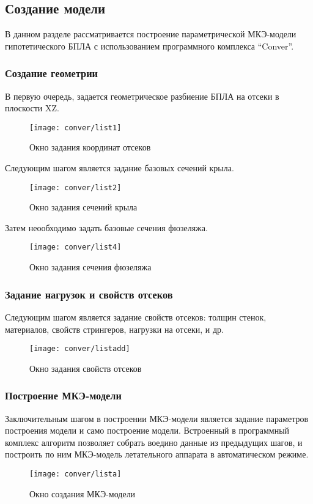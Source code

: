 \subsection{Создание модели}
\label{sec:creationOfOneModel}

В данном разделе рассматривается построение параметрической МКЭ-модели гипотетического БПЛА с использованием программного комплекса ``Conver''. 

\subsubsection{Создание геометрии}
В первую очередь, задается геометрическое разбиение БПЛА на отсеки в плоскости XZ. 

\begin{figure}[H]
\centering
\texttt{[image: conver/list1]}
\caption{Окно задания координат отсеков}
\label{fig:conver_list1}
\end{figure}


Следующим шагом является задание базовых сечений крыла.

\begin{figure}[H]
\centering
\texttt{[image: conver/list2]}
\caption{Окно задания сечений крыла}
\label{fig:conver_list2}
\end{figure} 

Затем неообходимо задать базовые сечения фюзеляжа.

\begin{figure}[H]
\centering
\texttt{[image: conver/list4]}
\caption{Окно задания сечения фюзеляжа}
\label{fig:conver_list4}
\end{figure}

\subsubsection{Задание нагрузок и свойств отсеков}

Следующим шагом является задание свойств отсеков: толщин стенок, материалов, свойств стрингеров, нагрузки на отсеки, и др. 

\begin{figure}[H]
\centering
\texttt{[image: conver/listadd]}
\caption{Окно задания свойств отсеков}
\label{fig:conver_listadd}
\end{figure}

\subsubsection{Построение МКЭ-модели}

Заключительным шагом в построении МКЭ-модели является задание параметров построения модели и само построение модели. Встроенный в программный комплекс алгоритм позволяет собрать воедино данные из предыдущих шагов, и построить по ним МКЭ-модель летательного аппарата в автоматическом режиме. 

\begin{figure}[H]
\centering
\texttt{[image: conver/lista]}
\caption{Окно создания МКЭ-модели}
\label{fig:conver_lista}
\end{figure}
